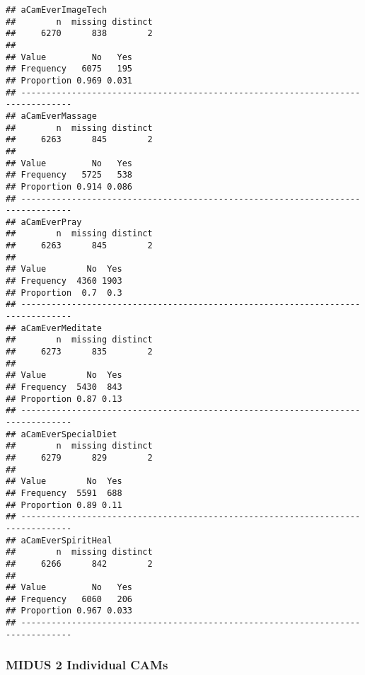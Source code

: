 \documentclass[
]{article}
\begin{document}
\begin{verbatim}
## aCamEverImageTech 
##        n  missing distinct 
##     6270      838        2 
##                       
## Value         No   Yes
## Frequency   6075   195
## Proportion 0.969 0.031
## --------------------------------------------------------------------------------
## aCamEverMassage 
##        n  missing distinct 
##     6263      845        2 
##                       
## Value         No   Yes
## Frequency   5725   538
## Proportion 0.914 0.086
## --------------------------------------------------------------------------------
## aCamEverPray 
##        n  missing distinct 
##     6263      845        2 
##                     
## Value        No  Yes
## Frequency  4360 1903
## Proportion  0.7  0.3
## --------------------------------------------------------------------------------
## aCamEverMeditate 
##        n  missing distinct 
##     6273      835        2 
##                     
## Value        No  Yes
## Frequency  5430  843
## Proportion 0.87 0.13
## --------------------------------------------------------------------------------
## aCamEverSpecialDiet 
##        n  missing distinct 
##     6279      829        2 
##                     
## Value        No  Yes
## Frequency  5591  688
## Proportion 0.89 0.11
## --------------------------------------------------------------------------------
## aCamEverSpiritHeal 
##        n  missing distinct 
##     6266      842        2 
##                       
## Value         No   Yes
## Frequency   6060   206
## Proportion 0.967 0.033
## --------------------------------------------------------------------------------
\end{verbatim}

\hypertarget{midus-2-individual-cams}{%
\subsubsection{MIDUS 2 Individual CAMs}\label{midus-2-individual-cams}}
\end{document}
